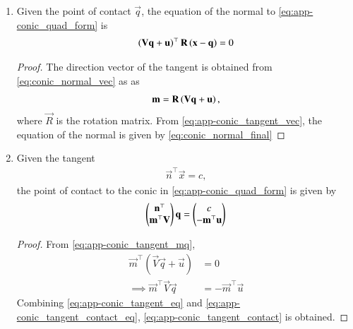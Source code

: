 \begin{enumerate}[label=\thesubsection.\arabic*.,ref=\thesubsection.\theenumi]
\begin{proof}
\begin{align}
    \brak{\vec{V}\vec{q}+\vec{u}}^{\top}\brak{\vec{x}-\vec{q}} &=0
    \\
    \implies \brak{\vec{V}\vec{q}+\vec{u}}^{\top}\vec{x}-\vec{q}^{\top}\vec{V}\vec{q}-\vec{u}^{\top}\vec{q} &= 0
    \end{align}
    which, upon substituting from \eqref{eq:app-conic_tangent_qquad} and simplifying yields 
  \eqref{eq:app-conic_tangent_final}
\end{proof}
\item
  Given the point of contact $\vec{q}$, the equation of the normal to \eqref{eq:app-conic_quad_form} is 
  \begin{align}
    \left(\mathbf{V}\mathbf{q}+\mathbf{u}\right)^{\top}\mathbf{R}\left(\mathbf{x}-\mathbf{q}\right) =0
  \end{align}
\begin{proof}
  The direction vector of the tangent is obtained from 
  \eqref{eq:conic_normal_vec} as
  as
  \begin{align}
  \label{eq:app-conic_tangent_vec}
	  \mathbf{m} = \mathbf{R}\left(\mathbf{V}\mathbf{q}+\mathbf{u}\right), 
  \end{align}  
  where $\vec{R}$ is the rotation matrix.
  From \eqref{eq:app-conic_tangent_vec}, the equation of the normal is
  given by 
  \eqref{eq:conic_normal_final}
\end{proof}

\item Given the tangent 
\begin{align}
  \label{eq:app-conic_tangent_eq}
\vec{n}^{\top}\vec{x} = c,
\end{align}
the point of  contact to the conic in \eqref{eq:app-conic_quad_form} is given by 
\begin{align}
  \label{eq:app-conic_tangent_contact}
        \begin{pmatrix}\mathbf{n}^{\top} \\ \mathbf{m}^{\top}\mathbf{V}\end{pmatrix} \mathbf{q} = \begin{pmatrix}c\\ -\mathbf{m}^{\top}\mathbf{u}\end{pmatrix}
\end{align}
		\begin{proof}
			From
  \eqref{eq:app-conic_tangent_mq},
\begin{align}
	\vec{m}^{\top}(\vec{V}\vec{q}+\vec{u})&=0
	\\
	\implies        \vec{m}^{\top}\vec{V}\vec{q} &= -\vec{m}^{\top}\vec{u}
  \label{eq:app-conic_tangent_contact_eq}
\end{align}
Combining 
  \eqref{eq:app-conic_tangent_eq}
  and 
  \eqref{eq:app-conic_tangent_contact_eq}, 
  \eqref{eq:app-conic_tangent_contact} is obtained.


\end{proof}
\end{enumerate}
